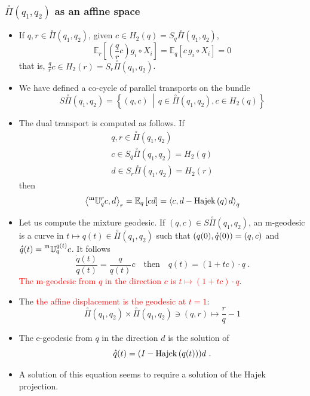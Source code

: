 \documentclass[xcolor=svgnames]{beamer}
\DeclareMathOperator{\Hajek}{Hajek}
\newcommand{\expectat}[2]{\mathbb E_{#1}\left[#2\right]}
\newcommand{\hajekof}[1]{\Hajek\left(#1\right)}
\newcommand{\mtransport}[2]{\prescript{\text{m}}{} {\mathbb U} _ {#1} ^ {#2}}
\newcommand{\openplan}[2]{\overset{\circ}\Pi\left(#1,#2\right)}
\newcommand{\rosso}[1]{\textcolor{red}{#1}}
\newcommand{\scalarat}[3]{\left\langle#2,#3\right\rangle_{#1}}
\newcommand{\setof}[2]{\left\{#1 \, \middle| \, #2 \right\}}
\newcommand{\velocity}[1]{\accentset{\star}{#1}}
\renewcommand{\emph}{\rosso}
\begin{document}
\begin{frame}\small\frametitle{$\openplan{q_1}{q_2}$ as an affine space}
\begin{itemize}
\item If $q , r \in \openplan {q_1} {q_2}$, given $c \in H_2(q) = S_q \openplan {q_1}{q_2}$,
\begin{equation*}
\expectat r {\left(\frac q r c\right) g_i \circ X_i} = \expectat q {c \,  g_i \circ X_i} = 0
\end{equation*}
that is, $\frac q r c \in H_2(r) = S_r \openplan {q_1}{q_2}$.
\item We have defined a co-cycle 
of parallel transports on the bundle
\begin{equation*}
    S \openplan {q_1}{q_2} = \setof {(q,c)}{ q \in \openplan {q_1}{q_2}, c \in H_2(q)} 
\end{equation*}
\item The dual transport is computed as follows. If
\begin{gather*}
  q, r \in \openplan {q_1}{q_2} \\
  c \in S_q \openplan {q_1}{q_2} = H_2(q) \\
  d \in S_r \openplan {q_1}{q_2} = H_2(r)
\end{gather*}
then
\begin{equation*}
\scalarat r {\mtransport q r c} d = \expectat q {cd} = \scalarat q c {d - \hajekof q d}
\end{equation*}
\item Let us compute the mixture geodesic. If $(q,c) \in S \openplan {q_1}{q_2}$, an m-geodesic is a curve in $t \mapsto q(t) \in \openplan {q_1}{q_2}$ such that $(q(0),\velocity q(0)) = (q,c)$ and $\velocity q(t) = \mtransport q {q(t)} c$. It follows
\begin{equation*}
    \frac {\dot q(t)}{q(t)} = \frac q {q(t)} c \quad \text{then} \quad q(t) = (1 +tc) \cdot q \ .
\end{equation*}
\emph{The m-geodesic from $q$ in the direction $c$ is $t \mapsto (1+tc)\cdot q$}. 
\item The \emph{the affine displacement is the geodesic at $t=1$}:
\begin{equation*}
 \openplan {q_1}{q_2} \times  \openplan {q_1}{q_2} \ni (q,r) \mapsto \frac r q - 1
\end{equation*}
\item The e-geodesic from $q$ in the direction $d$ is the solution of
\begin{equation*}
\velocity q(t) = (I - \hajekof{q(t)})d \ .
\end{equation*}
\item A solution of this equation seems to require a solution of the Hajek projection.
\end{itemize}

\end{frame}
\end{document}
